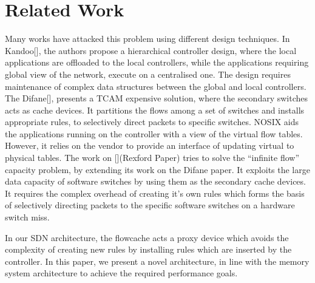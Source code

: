 \section{Related Work}

Many works have attacked this problem using different design techniques.
In Kandoo{[}{]}, the authors propose a hierarchical controller design,
where the local applications are offloaded to the local controllers,
while the applications requiring global view of the network, execute
on a centralised one. The design requires maintenance of complex data
structures between the global and local controllers. The Difane{[}{]},
presents a TCAM expensive solution, where the secondary switches acts
as cache devices. It partitions the flows among a set of switches
and installs appropriate rules, to selectively direct packets to specific
switches. NOSIX aids the applications running on the controller with
a view of the virtual flow tables. However, it relies on the vendor
to provide an interface of updating virtual to physical tables. The
work on {[}{]}(Rexford Paper) tries to solve the \textquotedblleft{}infinite
flow\textquotedblright{} capacity problem, by extending its work on
the Difane paper. It exploits the large data capacity of software
switches by using them as the secondary cache devices. It requires
the complex overhead of creating it\textquoteright{}s own rules which
forms the basis of selectively directing packets to the specific software
switches on a hardware switch miss.

In our SDN architecture, the flowcache acts a proxy device which avoids 
the complexity of creating new rules by installing rules which are inserted 
by the controller. In this paper, we present a novel architecture, in line 
with the memory system architecture to achieve the required performance goals.

